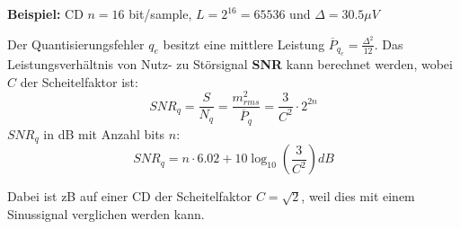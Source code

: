 \textbf{Beispiel:} CD
$n = 16$ bit/sample, $L=2^{16} = 65536$ und $\Delta = 30.5\mu V$

Der Quantisierungsfehler $q_e$ besitzt eine mittlere Leistung $\overline{P}_{q_e} = \frac{\Delta^2}{12}$. Das Leistungsverhältnis von Nutz- zu Störsignal \textbf{SNR} kann berechnet werden, wobei $C$ der Scheitelfaktor ist:
\[
SNR_q = \frac{S}{N_q} = \frac{m_{rms}^2}{\overline{P}_q} = \frac{3}{C^2}\cdot2^{2n}
\]
$SNR_q$ in dB mit Anzahl bits $n$:
\[
SNR_q = n\cdot 6.02 + 10\log_{10}\left(\frac{3}{C^2}\right)dB
\]

Dabei ist zB auf einer CD der Scheitelfaktor $C = \sqrt{2}$, weil dies mit einem Sinussignal verglichen werden kann. 
